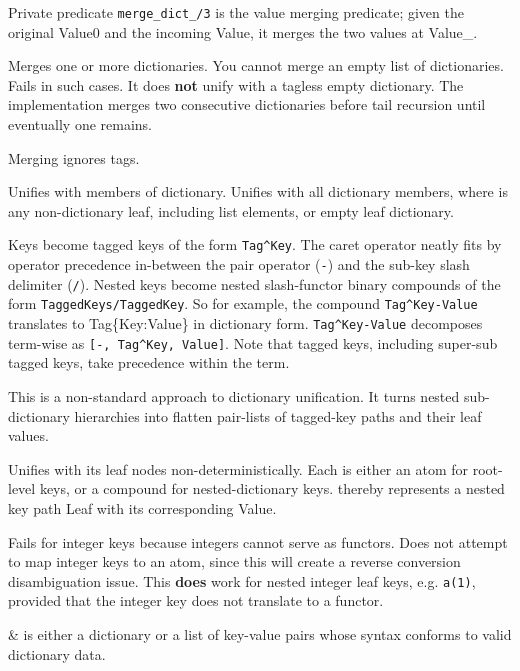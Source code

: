 \begin{description}
Private predicate \verb$merge_dict_/3$
is the value merging predicate; given the original Value0 and the
incoming Value, it merges the two values at Value_.

Merges one or more dictionaries. You cannot merge an empty list of
dictionaries. Fails in such cases. It does \textbf{not} unify  with a
tagless empty dictionary. The implementation merges two consecutive
dictionaries before tail recursion until eventually one remains.

Merging ignores tags.

Unifies with members of dictionary. Unifies  with all
dictionary members, where  is any non-dictionary leaf,
including list elements, or empty leaf dictionary.

Keys become tagged keys of the form \verb$Tag^Key$. The caret operator
neatly fits by operator precedence in-between the pair operator
(\verb$-$) and the sub-key slash delimiter (\verb$/$). Nested keys become
nested slash-functor binary compounds of the form
\verb$TaggedKeys/TaggedKey$. So for example, the compound \verb$Tag^Key-Value$
translates to Tag\{Key:Value\} in dictionary form. \verb$Tag^Key-Value$
decomposes term-wise as \verb$[-, Tag^Key, Value]$. Note that tagged
keys, including super-sub tagged keys, take precedence within the
term.

This is a non-standard approach to dictionary unification. It turns
nested sub-dictionary hierarchies into flatten pair-lists of
tagged-key paths and their leaf values.

\nodescription
Unifies  with its leaf nodes non-deterministically. Each  is
either an atom for root-level keys, or a compound for
nested-dictionary keys.  thereby represents a nested key path
Leaf with its corresponding Value.

Fails for integer keys because integers cannot serve as functors.
Does not attempt to map integer keys to an atom, since this will
create a reverse conversion disambiguation issue. This \textbf{does} work
for nested integer leaf keys, e.g. \verb$a(1)$, provided that the integer
key does not translate to a functor.

\begin{arguments}
 & is either a dictionary or a list of key-value pairs whose
syntax conforms to valid dictionary data. \\
\end{arguments}


\end{description}
